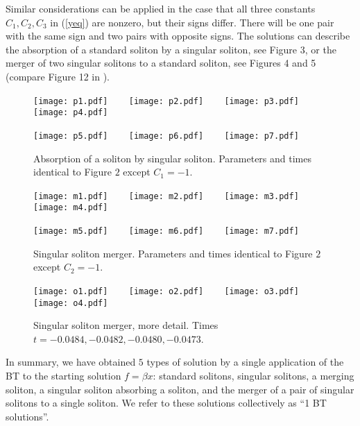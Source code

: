 \documentclass[12pt]{article}
\begin{document}
Similar considerations can be applied in the case that all three constants $C_1,C_2,C_3$ in (\ref{yeq}) are nonzero, but their signs
differ. There will be one pair with the same sign and two pairs with opposite signs. The solutions can describe the absorption of a
standard soliton by a singular soliton, see Figure 3,  or the merger of two singular solitons to a standard soliton, see Figures 4
and 5 (compare Figure 12 in \cite{beq11}). 

\begin{figure}
      \centerline{
        \texttt{[image: p1.pdf]} ~~~
        \texttt{[image: p2.pdf]} ~~~
        \texttt{[image: p3.pdf]} ~~~
        \texttt{[image: p4.pdf]} 
        }
      \centerline{
        \texttt{[image: p5.pdf]} ~~~
        \texttt{[image: p6.pdf]} ~~~
        \texttt{[image: p7.pdf]} 
        }
      \caption{Absorption of a soliton by singular soliton. Parameters and times identical to Figure $2$ except $C_1=-1$.} 
\end{figure}

\begin{figure}
      \centerline{
        \texttt{[image: m1.pdf]} ~~~
        \texttt{[image: m2.pdf]} ~~~
        \texttt{[image: m3.pdf]} ~~~
        \texttt{[image: m4.pdf]} 
        }
      \centerline{
        \texttt{[image: m5.pdf]} ~~~
        \texttt{[image: m6.pdf]} ~~~
        \texttt{[image: m7.pdf]} 
        }
      \caption{Singular soliton merger. Parameters and times identical to Figure $2$ except $C_2=-1$.} 
\end{figure}

\begin{figure}
      \centerline{
        \texttt{[image: o1.pdf]} ~~~
        \texttt{[image: o2.pdf]} ~~~
        \texttt{[image: o3.pdf]} ~~~
        \texttt{[image: o4.pdf]} 
        }
      \caption{Singular soliton merger, more detail. Times $t=-0.0484,-0.0482,-0.0480,-0.0473$.}
\end{figure}

In summary, we have obtained $5$ types of solution by a single application of the BT to the starting
solution $f=\beta x$: standard solitons, singular solitons, a merging soliton, a singular soliton
absorbing a soliton, and the merger of a pair of singular solitons to a single soliton. We refer to these
solutions collectively as ``1 BT solutions''. 
\end{document}
